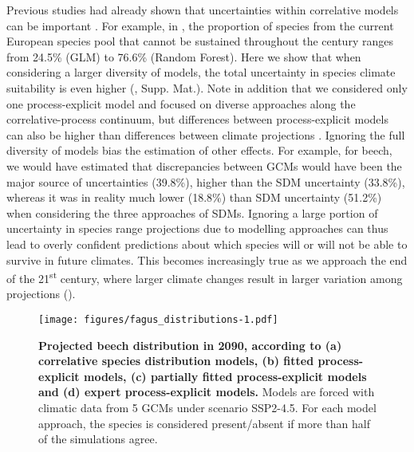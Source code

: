 \documentclass[letterpaper,8pt]{article}  %
\begin{document}
\begin{doublespacing}
\begin{linenumbers}
Previous studies had already shown that uncertainties within correlative models can be important  \citep{Thuiller2019}. For example, in \citet{Wessely2024}, the proportion of species from the current European species pool that cannot be sustained throughout the century ranges from 24.5\% (GLM) to 76.6\% (Random Forest). Here we show that when considering a larger diversity of models, the total uncertainty in species climate suitability is even higher (, Supp. Mat.). Note in addition that we considered only one process-explicit model and focused on diverse approaches along the correlative-process continuum, but differences between process-explicit models can also be higher than differences between climate projections \citep{Asseng2013}. Ignoring the full diversity of models bias the estimation of other effects. For example, for beech, we would have estimated that discrepancies between GCMs would have been the major source of uncertainties (39.8\%), higher than the SDM uncertainty (33.8\%), whereas it was in reality much lower (18.8\%) than SDM uncertainty (51.2\%) when considering the three approaches of SDMs. Ignoring a large portion of uncertainty in species range projections due to modelling approaches can thus lead to overly confident predictions about which species will or will not be able to survive in future climates.  This becomes increasingly true as we approach the end of the 21\textsuperscript{st} century, where larger climate changes result in larger variation among projections ().

\begin{figure}[t]
\hspace*{-2cm}
\begin{subcaptiongroup}
\label{fig:fagusA} 
\label{fig:fagusB}
\label{fig:fagusC}
\end{subcaptiongroup}
\texttt{[image: figures/fagus\_distributions-1.pdf]}
\caption{\textbf{Projected beech distribution in 2090, according to (a) correlative species distribution models, (b) fitted process-explicit models, (c) partially fitted process-explicit models and (d) expert process-explicit models.} Models are forced with climatic data from 5 GCMs under scenario SSP2-4.5. For each model approach, the species is considered present/absent if more than half of the simulations agree.}
\label{fig:fagus}
\end{figure}


\end{linenumbers}
\end{doublespacing}
\end{document}

